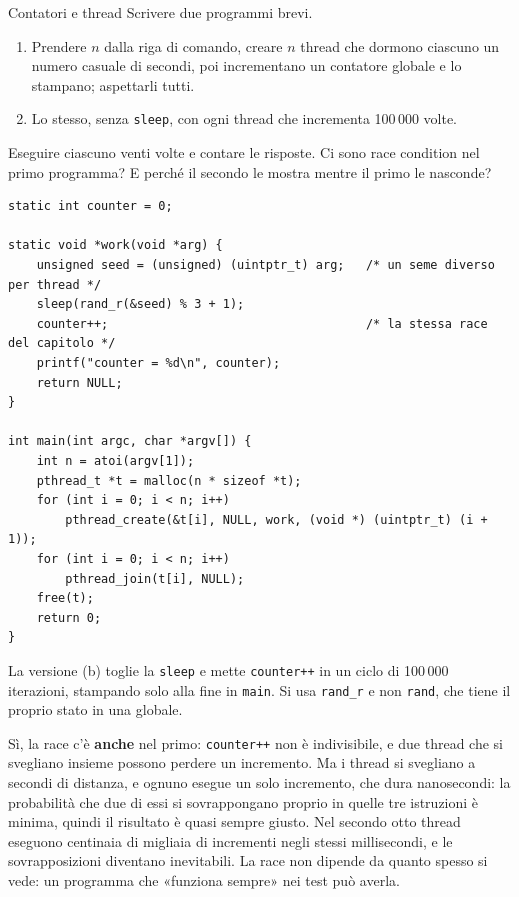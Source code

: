 \begin{esercizio}{Contatori e thread}
Scrivere due programmi brevi.
\begin{enumerate}[label=(\alph*)]
    \item Prendere $n$ dalla riga di comando, creare $n$ thread che dormono ciascuno un numero casuale di secondi, poi
          incrementano un contatore globale e lo stampano; aspettarli tutti.
    \item Lo stesso, senza \texttt{sleep}, con ogni thread che incrementa 100\,000 volte.
\end{enumerate}
Eseguire ciascuno venti volte e contare le risposte. Ci sono race condition nel primo programma? E perché il secondo le
mostra mentre il primo le nasconde?

\svolgimento
\begin{lstlisting}[language={[POSIX]C}, style=wnumbers, title={threads.c: la versione (a)}]
static int counter = 0;

static void *work(void *arg) {
    unsigned seed = (unsigned) (uintptr_t) arg;   /* un seme diverso per thread */
    sleep(rand_r(&seed) % 3 + 1);
    counter++;                                    /* la stessa race del capitolo */
    printf("counter = %d\n", counter);
    return NULL;
}

int main(int argc, char *argv[]) {
    int n = atoi(argv[1]);
    pthread_t *t = malloc(n * sizeof *t);
    for (int i = 0; i < n; i++)
        pthread_create(&t[i], NULL, work, (void *) (uintptr_t) (i + 1));
    for (int i = 0; i < n; i++)
        pthread_join(t[i], NULL);
    free(t);
    return 0;
}
\end{lstlisting}
La versione (b) toglie la \texttt{sleep} e mette \texttt{counter++} in un ciclo di 100\,000 iterazioni, stampando
solo alla fine in \texttt{main}. Si usa \texttt{rand\_r} e non \texttt{rand}, che tiene il proprio stato in una globale.

Sì, la race c'è \textbf{anche} nel primo: \texttt{counter++} non è indivisibile, e due thread che si svegliano insieme
possono perdere un incremento. Ma i thread si svegliano a secondi di distanza, e ognuno esegue un solo incremento, che
dura nanosecondi: la probabilità che due di essi si sovrappongano proprio in quelle tre istruzioni è minima, quindi il
risultato è quasi sempre giusto. Nel secondo otto thread eseguono centinaia di migliaia di incrementi negli stessi
millisecondi, e le sovrapposizioni diventano inevitabili. La race non dipende da quanto spesso si vede: un programma
che «funziona sempre» nei test può averla.
\end{esercizio}

